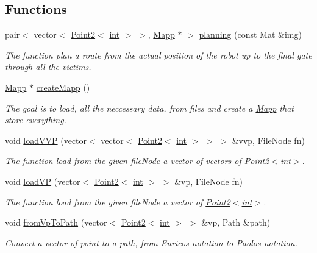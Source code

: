 \subsection*{Functions}
\begin{DoxyCompactItemize}
\item 
pair$<$ vector$<$ \mbox{\hyperlink{class_point2}{Point2}}$<$ \mbox{\hyperlink{draw_8hh_aa620a13339ac3a1177c86edc549fda9b}{int}} $>$ $>$, \mbox{\hyperlink{class_mapp}{Mapp}} $\ast$ $>$ \mbox{\hyperlink{planning_8hh_aeef9aecfb831780fd7775ac4e750aad8}{planning}} (const Mat \&img)
\begin{DoxyCompactList}\small\item\em The function plan a route from the actual position of the robot up to the final gate through all the victims. \end{DoxyCompactList}\item 
\mbox{\hyperlink{class_mapp}{Mapp}} $\ast$ \mbox{\hyperlink{planning_8hh_a7c7b2e381023697547786d663894435d}{create\+Mapp}} ()
\begin{DoxyCompactList}\small\item\em The goal is to load, all the neccessary data, from files and create a \mbox{\hyperlink{class_mapp}{Mapp}} that store everything. \end{DoxyCompactList}\item 
void \mbox{\hyperlink{planning_8hh_ad6ed6af027c9a35de0c872788d50c733}{load\+V\+VP}} (vector$<$ vector$<$ \mbox{\hyperlink{class_point2}{Point2}}$<$ \mbox{\hyperlink{draw_8hh_aa620a13339ac3a1177c86edc549fda9b}{int}} $>$ $>$ $>$ \&vvp, File\+Node fn)
\begin{DoxyCompactList}\small\item\em The function load from the given file\+Node a vector of vectors of \mbox{\hyperlink{class_point2}{Point2$<$int$>$}}. \end{DoxyCompactList}\item 
void \mbox{\hyperlink{planning_8hh_aa3a220a5ab5f16da550b786caa041f6b}{load\+VP}} (vector$<$ \mbox{\hyperlink{class_point2}{Point2}}$<$ \mbox{\hyperlink{draw_8hh_aa620a13339ac3a1177c86edc549fda9b}{int}} $>$ $>$ \&vp, File\+Node fn)
\begin{DoxyCompactList}\small\item\em The function load from the given file\+Node a vector of \mbox{\hyperlink{class_point2}{Point2$<$int$>$}}. \end{DoxyCompactList}\item 
void \mbox{\hyperlink{planning_8hh_a0a3e9f80c221e62df622b89c26ab42e2}{from\+Vp\+To\+Path}} (vector$<$ \mbox{\hyperlink{class_point2}{Point2}}$<$ \mbox{\hyperlink{draw_8hh_aa620a13339ac3a1177c86edc549fda9b}{int}} $>$ $>$ \&vp, Path \&path)
\begin{DoxyCompactList}\small\item\em Convert a vector of point to a path, from Enrico\textquotesingle{}s notation to Paolo\textquotesingle{}s notation. \end{DoxyCompactList}\end{DoxyCompactItemize}


